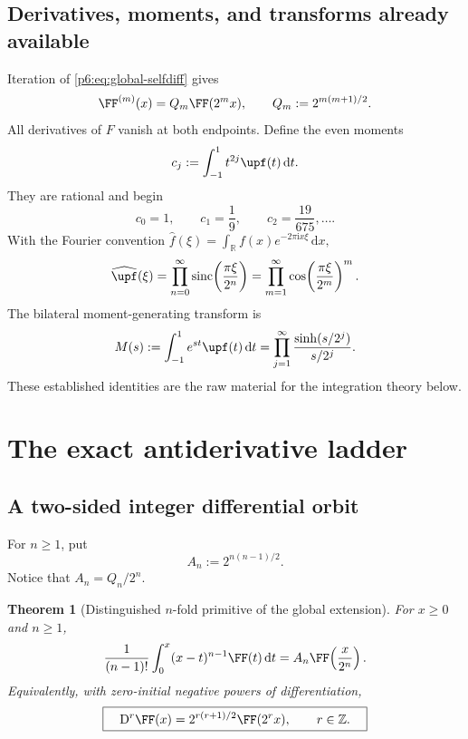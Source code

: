 \documentclass[11pt,oneside]{article}
\newtheorem{theorem}{Theorem}[section]
\theoremstyle{definition}
\theoremstyle{remark}
\newcommand{\R}{\mathbb R}
\newcommand{\dd}{\,\mathrm d}
\newcommand{\ii}{\mathrm i}
\newcommand{\1}{\mathbf 1}
\DeclareMathOperator{\sinc}{sinc}
\begin{document}
\subsection{Derivatives, moments, and transforms already available}

Iteration of \eqref{p6:eq:global-selfdiff} gives
\begin{equation}
 \FF^{(m)}(x)=Q_m\FF(2^m x),\qquad
 Q_m:=2^{m(m+1)/2}.                                      \label{p6:eq:derivative-orbit}
\end{equation}
All derivatives of \(F\) vanish at both endpoints.  Define the even moments
\begin{equation}
 c_j:=\int_{-1}^1t^{2j}\upf(t)\dd t.                     \label{p6:eq:cj}
\end{equation}
They are rational and begin
\[
 c_0=1,\qquad c_1=\frac19,\qquad c_2=\frac{19}{675},\ldots.
\]
With the Fourier convention
\(
 \widehat f(\xi)=\int_\R f(x)e^{-2\pi\ii x\xi}\dd x,
\)
\begin{equation}
 \widehat{\upf}(\xi)
 =\prod_{n=0}^{\infty}\sinc\!\left(\frac{\pi\xi}{2^n}\right)
 =\prod_{m=1}^{\infty}\cos\!\left(\frac{\pi\xi}{2^m}\right)^m. \label{p6:eq:up-fourier}
\end{equation}
The bilateral moment-generating transform is
\begin{equation}
 M(s):=\int_{-1}^1e^{st}\upf(t)\dd t
 =\prod_{j=1}^{\infty}\frac{\sinh(s/2^j)}{s/2^j}.        \label{p6:eq:M-product}
\end{equation}
These established identities are the raw material for the integration theory below.

\section{The exact antiderivative ladder}

\subsection{A two-sided integer differential orbit}

For \(n\ge1\), put
\begin{equation}
 A_n:=2^{n(n-1)/2}.                                      \label{p6:eq:An}
\end{equation}
Notice that \(A_n=Q_n/2^n\).

\begin{theorem}[Distinguished \(n\)-fold primitive of the global extension]
\label{p6:thm:global-primitive}
For \(x\ge0\) and \(n\ge1\),
\begin{equation}
 \frac1{(n-1)!}\int_0^x(x-t)^{n-1}\FF(t)\dd t
 =A_n\FF\!\left(\frac{x}{2^n}\right).                  \label{p6:eq:global-primitive}
\end{equation}
Equivalently, with zero-initial negative powers of differentiation,
\begin{equation}
 \boxed{\quad
 \mathrm D^r\FF(x)=2^{r(r+1)/2}\FF(2^r x),
 \qquad r\in\mathbb Z.
 \quad}                                                  \label{p6:eq:integer-orbit}
\end{equation}
\end{theorem}
\end{document}
